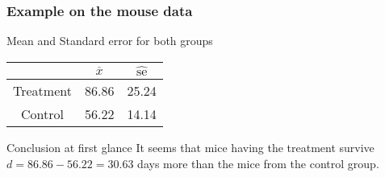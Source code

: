 \frame
{
\frametitle{Example on the mouse data}



\begin{exampleblock}{Mean and Standard error for both groups}
\begin{table}[!h]
\begin{tabular}{c|c|c}
& $\overline{x}$ & $\hat{\mathrm{se}} $ \\
\hline
Treatment & 86.86 & 25.24 \\
\hline
Control & 56.22 & 14.14 \\
\end{tabular}
\end{table}
\end{exampleblock}


\begin{block}{Conclusion at first glance} 
It seems that mice having the treatment survive $d=86.86-56.22=30.63$ days more than the mice from the control group.
\end{block}



}
